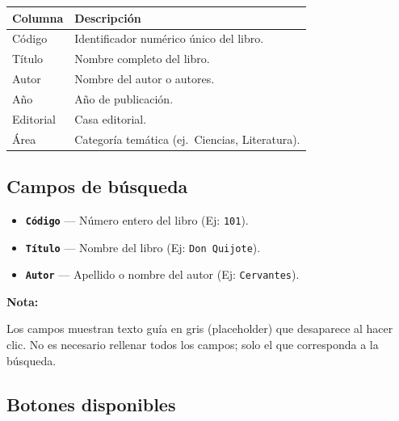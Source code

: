 \documentclass[12pt, a4paper]{article}
\newenvironment{notebox}{%
  \vspace{6pt}\par\noindent
  \begin{lrbox}{\mybox}%
    \begin{minipage}{\dimexpr\linewidth-16pt\relax}%
      \noindent\textcolor{UCRBlue}{\textbf{Nota:}}\ %
}{%
    \end{minipage}%
  \end{lrbox}%
  \setlength{\fboxsep}{8pt}%
  \colorbox{NoteBlue}{\usebox{\mybox}}%
  \vspace{6pt}\par%
}
\newcommand{\campo}[1]{\texttt{\textbf{#1}}}
\begin{document}
\begin{center}
  \begin{tabular}{ll}
    \toprule
    \textbf{Columna} & \textbf{Descripción} \\
    \midrule
    Código    & Identificador numérico único del libro. \\
    Título    & Nombre completo del libro. \\
    Autor     & Nombre del autor o autores. \\
    Año       & Año de publicación. \\
    Editorial & Casa editorial. \\
    Área      & Categoría temática (ej.\ Ciencias, Literatura). \\
    \bottomrule
  \end{tabular}
\end{center}

\subsection{Campos de búsqueda}

\begin{itemize}
  \item \campo{Código} --- Número entero del libro (Ej: \texttt{101}).
  \item \campo{Título} --- Nombre del libro (Ej: \texttt{Don Quijote}).
  \item \campo{Autor} --- Apellido o nombre del autor (Ej: \texttt{Cervantes}).
\end{itemize}

\begin{notebox}
Los campos muestran texto guía en gris (placeholder) que desaparece al hacer clic.
No es necesario rellenar todos los campos; solo el que corresponda a la búsqueda.
\end{notebox}

\subsection{Botones disponibles}
\end{document}
